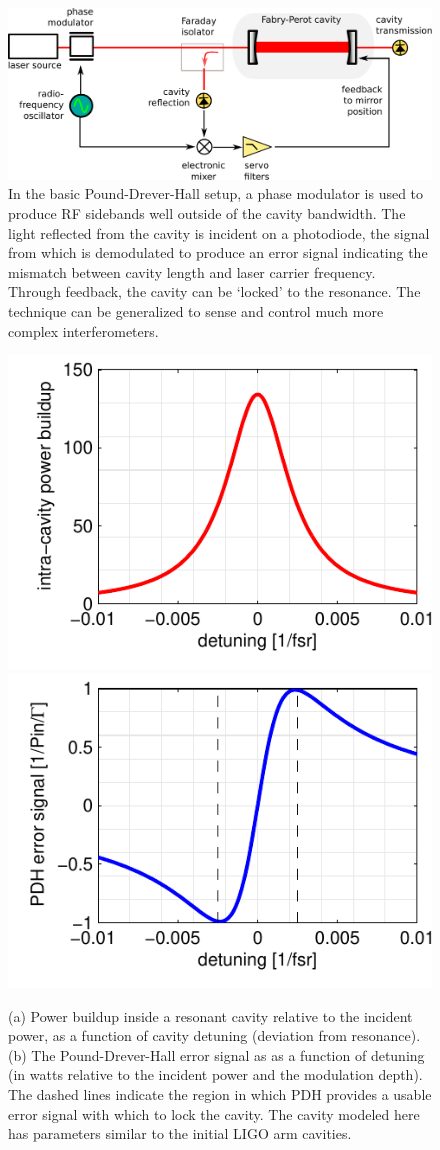 \begin{figure}
\includegraphics[width=\columnwidth]{figures/pdh-diagram.pdf}
\caption[Pound-Drever-Hall setup]{\label{fig:pdh-diagram}In the basic
Pound-Drever-Hall setup, a phase modulator is used to produce RF sidebands well 
outside of the cavity bandwidth.  The light reflected from the cavity
is incident on a photodiode, the signal from which is demodulated to
produce an error signal indicating the mismatch between cavity length
and laser carrier frequency.  Through feedback, the cavity can be `locked' 
to the resonance.  The technique can be generalized to sense and control
much more complex interferometers.}
\end{figure}

\begin{figure}
\includegraphics[width=0.5\columnwidth]{figures/cav-power.pdf}
\includegraphics[width=0.5\columnwidth]{figures/cav-pdh.pdf}
\caption[Pound-Drever-Hall error signal]{\label{fig:pdh-error}
(a) Power buildup inside a resonant cavity relative to the incident
power, as a function of cavity detuning (deviation from resonance).
(b) The Pound-Drever-Hall error signal as as a function of detuning
(in watts relative to the incident power and the modulation depth).
The dashed lines indicate the region in which PDH provides a usable
error signal with which to lock the cavity.  The cavity modeled here
has parameters similar to the initial LIGO arm cavities.
}
\end{figure}

